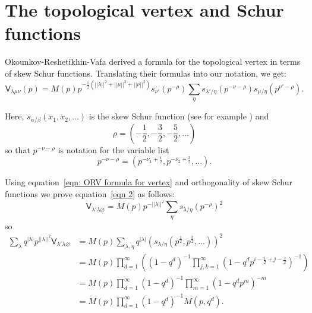 \documentclass[12pt]{amsart}
\newcommand{\Vsf}{\mathsf{V}}
\renewcommand{\emptyset}{\varnothing}
\newcommand{\half}{\frac{1}{2}}
\theoremstyle{definition}
\newcommand{\ptotheminusrho}{p^{-\rho}}
\begin{document}
\section{The topological vertex and Schur functions}\label{sec: topo
vertex and schur fncs}

Okounkov-Reshetikhin-Vafa derived a formula for the topological vertex
in terms of skew Schur functions. Translating their formulas
\cite[3.20\& 3.21]{Ok-Re-Va} into our notation, we get:
\begin{equation}\label{eqn: ORV formula for vertex}
\Vsf_{\lambda \mu \nu}(p) = M(p) p^{-\half (||\lambda ||^{2}+||\mu
||^{2}+||\nu ||^{2})} s_{\nu '}(\ptotheminusrho ) \sum_{\eta} s_{\lambda
'/\eta}(p^{-\nu -\rho})s_{\mu /\eta}(p^{\nu '-\rho} ).
\end{equation}

Here, $s_{\alpha /\beta}(x_{1},x_{2},\dots )$ is the skew Schur
function (see for example \cite[\S~5]{MacDonald}) and 
\[
\rho =\left(-\half ,-\frac{3}{2},-\frac{5}{2},\dots  \right)
\]
so that $p^{-\nu -\rho}$ is notation for the variable list
\[
p^{-\nu -\rho} = \left(p^{-\nu_{1} +\half },p^{-\nu_{2} +\frac{3}{2}},\dots   \right).
\]

Using equation~\eqref{eqn: ORV formula for vertex} and orthogonality
of skew Schur functions \cite[28(a) pg 94]{MacDonald} we prove
equation~\eqref{eqn 2} as follows:
\[
\Vsf_{\lambda '\lambda \emptyset} = M(p)p^{-||\lambda ||^{2}}
\sum_{\eta} s_{\lambda /\eta}(\ptotheminusrho )^{2}
\]
so
\begin{align*}
\sum_{\lambda} q^{|\lambda |} p^{||\lambda ||^{2}} \Vsf_{\lambda
'\lambda \emptyset} &= M(p)\sum_{\lambda ,\eta} q^{|\lambda |} (s_{\lambda /\eta}(p^{\half },p^{\frac{3}{2}},\dots ))^{2}\\
&=M(p)\prod_{d=1}^{\infty} \left((1-q^{d})^{-1}\prod_{j,k=1}^{\infty}(1-q^{d}p^{i-\half +j-\half })^{-1} \right)\\
&= M(p) \prod_{d=1}^{\infty} (1-q^{d})^{-1}\prod_{m=1}^{\infty}(1-q^{d}p^{m})^{-m}\\
&=M(p)\prod_{d=1}^{\infty} (1-q^{d})^{-1}M(p,q^{d}).
\end{align*}
\end{document}
